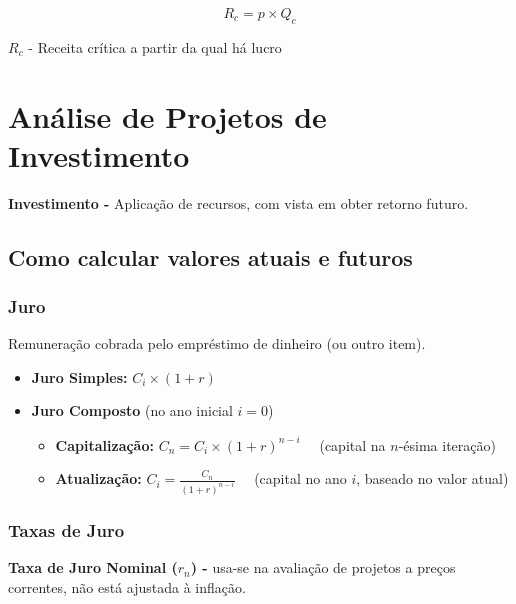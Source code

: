 \documentclass[11pt]{article}
\begin{document}
\begin{minipage}{0.5\textwidth}
    \begin{equation*}
        R_c = p \times Q_c
    \end{equation*}
\end{minipage}
\begin{minipage}{0.49\textwidth}
    $R_c$ - Receita crítica a partir da qual há lucro
\end{minipage}

\newpage

\section{Análise de Projetos de Investimento}

\textbf{Investimento -} Aplicação de recursos, com vista em obter retorno futuro.

\subsection{Como calcular valores atuais e futuros}

\subsubsection{Juro}

Remuneração cobrada pelo empréstimo de dinheiro (ou outro item).
\begin{itemize}[topsep=0pt]
    \item \textbf{Juro Simples: }$C_i\times (1+r)$
    \item \textbf{Juro Composto} (no ano inicial $i=0$)
          \begin{itemize}
              \item \textbf{Capitalização: }$C_n=C_i\times(1+r)^{n-i}$
                    \ \ (capital na $n$-ésima iteração)
              \item \textbf{Atualização: }$\displaystyle C_i=\frac{C_n}{(1+r)^{n-i}}$
                    \ \ (capital no ano $i$, baseado no valor atual)
          \end{itemize}
\end{itemize}

\subsubsection{Taxas de Juro}

\textbf{Taxa de Juro Nominal ($r_n$) -} usa-se na avaliação de projetos a preços correntes, não está ajustada à inflação.
\end{document}
